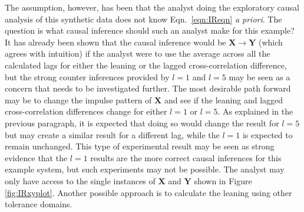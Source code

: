 The assumption, however, has been that the analyst doing the exploratory causal analysis of this synthetic data does not know Eqn.\ \ref{eqn:IReqn} {\em a priori}.  The question is what causal inference should such an analyst make for this example?  It has already been shown that the causal inference would be $\mathbf{X}\rightarrow\mathbf{Y}$ (which agrees with intuition) if the analyst were to use the average across all the calculated lags for either the leaning or the lagged cross-correlation difference, but the strong counter inferences provided by $l=1$ and $l=5$ may be seen as a concern that needs to be investigated further.  The most desirable path forward may be to change the impulse pattern of $\mathbf{X}$ and see if the leaning and lagged cross-correlation differences change for either $l=1$ or $l=5$.  As explained in the previous paragraph, it is expected that doing so would change the result for $l=5$ but may create a similar result for a different lag, while the $l=1$ is expected to remain unchanged.  This type of experimental result may be seen as strong evidence that the $l=1$ results are the more correct causal inferences for this example system, but such experiments may not be possible.  The analyst may only have access to the single instances of $\mathbf{X}$ and $\mathbf{Y}$ shown in Figure \ref{fig:IRxyplot}.  Another possible approach is to calculate the leaning using other tolerance domains.
